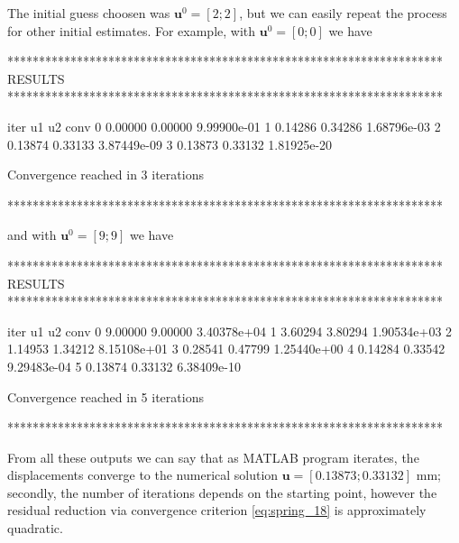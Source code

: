 The initial guess choosen was $\mathbf{u}^0=[2;2]$, but we can easily repeat the process for other initial estimates. For example, with $\mathbf{u}^0=[0;0]$ we have 
\begin{matlaboutput}
*********************************************************************
RESULTS
*********************************************************************

iter   u1        u2        conv
   0   0.00000   0.00000   9.99900e-01
   1   0.14286   0.34286   1.68796e-03
   2   0.13874   0.33133   3.87449e-09
   3   0.13873   0.33132   1.81925e-20

Convergence reached in 3 iterations

*********************************************************************
\end{matlaboutput}

\newpage

and with $\mathbf{u}^0=[9;9]$ we have
\begin{matlaboutput}
*********************************************************************
RESULTS
*********************************************************************

iter   u1        u2        conv
   0   9.00000   9.00000   3.40378e+04
   1   3.60294   3.80294   1.90534e+03
   2   1.14953   1.34212   8.15108e+01
   3   0.28541   0.47799   1.25440e+00
   4   0.14284   0.33542   9.29483e-04
   5   0.13874   0.33132   6.38409e-10

Convergence reached in 5 iterations

*********************************************************************
\end{matlaboutput}

From all these outputs we can say that as MATLAB program iterates, the displacements converge to the numerical solution $\mathbf{u}=[0.13873;0.33132]$ mm; secondly, the number of iterations depends on the starting point, however the residual reduction via convergence criterion \eqref{eq:spring_18} is approximately quadratic.

